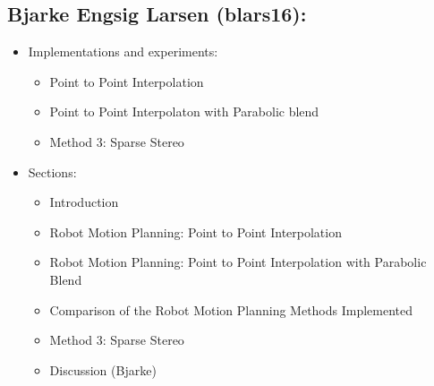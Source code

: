 \documentclass[../main.tex]{subfiles}
\begin{document}
\subsection*{Bjarke Engsig Larsen (blars16):}
\begin{itemize}
    \item Implementations and experiments:
    \begin{itemize}
        \item Point to Point Interpolation
        \item Point to Point Interpolaton with Parabolic blend
        \item Method 3: Sparse Stereo
    \end{itemize}
    \item Sections:
    \begin{itemize}
        \item Introduction
        \item Robot Motion Planning: Point to Point Interpolation
        \item Robot Motion Planning: Point to Point Interpolation with Parabolic Blend
        \item Comparison of the Robot Motion Planning Methods Implemented
        \item Method 3: Sparse Stereo
        \item Discussion (Bjarke)
    \end{itemize}
\end{itemize}
\end{document}
